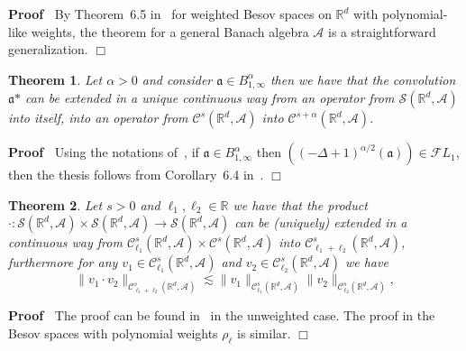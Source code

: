 \documentclass{article}
\newcommand{\asterisk}{\mathord{*}}
\newenvironment{proof}{\noindent\textbf{Proof\ }}{\hspace*{\fill}$\Box$\medskip}
\newtheorem{theorem}{Theorem}
\begin{document}
\begin{proof}
  By Theorem~6.5 in~{\cite{TriebelIII}} for weighted Besov spaces on
  $\mathbb{R}^d$ with polynomial-like weights, the theorem for a general
  Banach algebra $\mathcal{A}$ is a straightforward generalization.
\end{proof}

\begin{theorem}
  \label{theorem_convolution}Let $\alpha > 0$ and consider $\mathfrak{a} \in
  B^{\alpha}_{1, \infty}$ then we have that the convolution $\mathfrak{a}
  \asterisk$ can be extended in a unique continuous way from an operator from
  $\mathcal{S} (\mathbb{R}^d, \mathcal{A})$ into itself, into an operator from
  $\mathcal{C}^s (\mathbb{R}^d, \mathcal{A})$ into $\mathcal{C}^{s + \alpha}
  (\mathbb{R}^d, \mathcal{A})$.
\end{theorem}

\begin{proof}
  Using the notations of~{\cite{Amann1997}}, if $\mathfrak{a \in}
  B^{\alpha}_{1, \infty}$ then $((- \Delta + 1)^{\alpha / 2} (\mathfrak{a}))
  \in \mathcal{F} L_1$, then the thesis follows from Corollary~6.4
  in~{\cite{Amann1997}}.
\end{proof}

\begin{theorem}
  \label{theorem_multiplication}Let $s > 0$ and $\ell_1, \ell_2 \in
  \mathbb{R}$ we have that the product $\cdot : \mathcal{S} (\mathbb{R}^d,
  \mathcal{A}) \times \mathcal{S} (\mathbb{R}^d, \mathcal{A}) \rightarrow
  \mathcal{S} (\mathbb{R}^d, \mathcal{A})$ can be (uniquely) extended in a
  continuous way from $\mathcal{C}^s_{\ell_1} (\mathbb{R}^d, \mathcal{A})
  \times \mathcal{C}^s (\mathbb{R}^d, \mathcal{A})$ into
  $\mathcal{C}^s_{\ell_1 + \ell_2} (\mathbb{R}^d, \mathcal{A})$, furthermore
  for any $v_1 \in \mathcal{C}^s_{\ell_1} (\mathbb{R}^d, \mathcal{A})$ and
  $v_2 \in \mathcal{C}^s_{\ell_2} (\mathbb{R}^d, \mathcal{A})$ we have
  \[ \| v_1 \cdot v_2 \|_{\mathcal{C}^s_{\ell_1 + \ell_2} (\mathbb{R}^d,
     \mathcal{A})} \lesssim \| v_1 \|_{\mathcal{C}^s_{\ell_1} (\mathbb{R}^d,
     \mathcal{A})}  \| v_2 \|_{\mathcal{C}^s_{\ell_2} (\mathbb{R}^d,
     \mathcal{A})}, \]
\end{theorem}

\begin{proof}
  The proof can be found in~{\cite{Amann2019}} in the unweighted case. The
  proof in the Besov spaces with polynomial weights $\rho_{\ell}$ is similar.
\end{proof}
\end{document}
